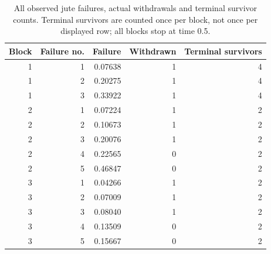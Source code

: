 \begin{table}[htbp]
\centering
\caption{All observed jute failures, actual withdrawals and terminal survivor counts. Terminal survivors are counted once per block, not once per displayed row; all blocks stop at time 0.5.}\label{tab:jute-retained}
\small
\begin{tabular}{rrrrr}
\toprule
Block & Failure no. & Failure & Withdrawn & Terminal survivors \\
\midrule
1 & 1 & 0.07638 & 1 & 4 \\
1 & 2 & 0.20275 & 1 & 4 \\
1 & 3 & 0.33922 & 1 & 4 \\
2 & 1 & 0.07224 & 1 & 2 \\
2 & 2 & 0.10673 & 1 & 2 \\
2 & 3 & 0.20076 & 1 & 2 \\
2 & 4 & 0.22565 & 0 & 2 \\
2 & 5 & 0.46847 & 0 & 2 \\
3 & 1 & 0.04266 & 1 & 2 \\
3 & 2 & 0.07009 & 1 & 2 \\
3 & 3 & 0.08040 & 1 & 2 \\
3 & 4 & 0.13509 & 0 & 2 \\
3 & 5 & 0.15667 & 0 & 2 \\
\bottomrule
\end{tabular}
\end{table}
